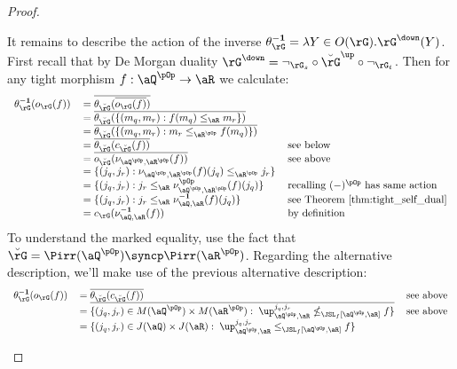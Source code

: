 \documentclass{article}
\begin{document}
\begin{proof}
\begin{enumerate}
\smallskip
It remains to describe the action of the inverse $\theta_\rG^{\bf-1} = \lambda Y \in O(\rG).\rG^\down(Y)$. First recall that by De Morgan duality $\rG^\down = \neg_{\rG_s} \circ \breve{\rG}^\up \circ \neg_{\rG_t}$. Then for any tight morphism $f : \aQ^{\pOp} \to \aR$ we calculate:
\[
\begin{tabular}{lll}
$\theta_\rG^{\bf-1}(o_\rG(f))$
&
$= \overline{\theta_{\breve{\rG}}(\overline{o_\rG(f)})}$
\\&
$= \overline{\theta_{\breve{\rG}}(\{ (m_q,m_r) : f(m_q) \leq_\aR m_r  \})}$
\\&
$= \overline{\theta_{\breve{\rG}}(\{ (m_q,m_r) : m_r \leq_{\aR^{\pOp}} f(m_q)  \})}$
\\&
$= \overline{\theta_{\breve{\rG}}(c_{\breve{\rG}}(f))}$
& see below
\\&
$= \overline{o_{\breve{\rG}}(\nu_{\aQ^{\pOp},\aR^{\pOp}}(f))}$
& see above
\\&
$= \{ (j_q,j_r) : \nu_{\aQ^{\pOp},\aR^{\pOp}}(f)(j_q) \leq_{\aR^{\pOp}} j_r  \}$
\\&
$= \{ (j_q,j_r) :  j_r \leq_\aR \nu_{\aQ^{\pOp},\aR^{\pOp}}^{\pOp}(f)(j_q)  \}$
& recalling $(-)^{\pOp}$ has same action
\\&
$= \{ (j_q,j_r) :  j_r \leq_\aR \nu_{\aQ,\aR}^{\bf-1}(f)(j_q)  \}$
& see Theorem \ref{thm:tight_self_dual}
\\&
$= c_\rG(\nu_{\aQ,\aR}^{\bf-1}(f))$
& by definition
\end{tabular}
\]
To understand the marked equality, use the fact that $\breve{\rG} = \Pirr(\aQ^{\pOp}) \syncp \Pirr(\aR^{\pOp})$. Regarding the alternative description, we'll make use of the previous alternative description:
\[
\begin{tabular}{lll}
$\theta_\rG^{\bf-1}(o_\rG(f))$
&
$= \overline{\theta_{\breve{\rG}}(c_{\breve{\rG}}(f))}$
& see above
\\&
$= \overline{\{ (j_q,j_r) \in M(\aQ^{\pOp}) \times M(\aR^{\pOp}) : \; \up_{\aQ^{\pOp},\aR}^{j_q,j_r} \nleq_{\JSL_f[\aQ^{\pOp},\aR]} f \}}$
& see above
\\&
$= \{ (j_q,j_r) \in J(\aQ) \times J(\aR) : \; \up_{\aQ^{\pOp},\aR}^{j_q,j_r} \leq_{\JSL_f[\aQ^{\pOp},\aR]} f \}$
\end{tabular}
\] 

\end{enumerate}
\end{proof}
\end{document}
